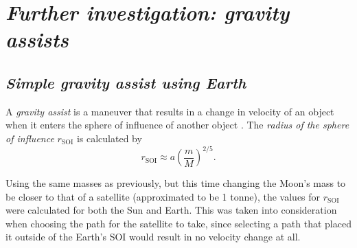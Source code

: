 \documentclass[11pt, english]{report}
\begin{document}
\section{\textsl{Further investigation: gravity assists}}
\subsection{\textsl{Simple gravity assist using Earth}}

\normalsize{\noindent A \emph{gravity assist} is a maneuver that results in a change in velocity of an object when it enters the sphere of influence of another object \cite{noauthor_basics_nodate}. The \emph{radius of the sphere of influence} $r_{\mathrm{SOI}}$  \cite{noauthor_sphere_nodate} is calculated by
\begin{equation}
    r_{\mathrm{SOI}} \approx a\left( \frac{m}{M} \right)^{2/5}.
\end{equation}

\noindent Using the same masses as previously, but this time changing the Moon's mass to be closer to that of a satellite (approximated to be 1 tonne), the values for $r_{\mathrm{SOI}}$ were calculated for both the Sun and Earth. This was taken into consideration when choosing the path for the satellite to take, since selecting a path that placed it outside of the Earth's SOI would result in no velocity change at all. 

}
\end{document}
